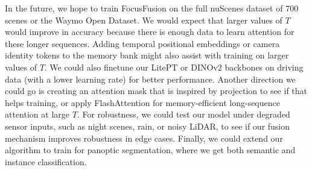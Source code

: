 \documentclass[10pt,twocolumn,letterpaper]{article}
\begin{document}
In the future, we hope to train FocusFusion on the full nuScenes dataset of 700 scenes or the Waymo Open Dataset. We would expect that larger values of $T$ would improve in accuracy because there is enough data to learn attention for these longer sequences. Adding temporal positional embeddings or camera identity tokens to the memory bank might also assist with training on larger values of $T$. We could also finetune our LitePT or DINOv2 backbones on driving data (with a lower learning rate) for better performance. Another direction we could go is creating an attention mask that is inspired by projection to see if that helps training, or apply FlashAttention for memory-efficient long-sequence attention at large $T$. For robustness, we could test our model under degraded sensor inputs, such as night scenes, rain, or noisy LiDAR, to see if our fusion mechanism improves robustness in edge cases. Finally, we could extend our algorithm to train for panoptic segmentation, where we get both semantic and instance classification.
\end{document}
